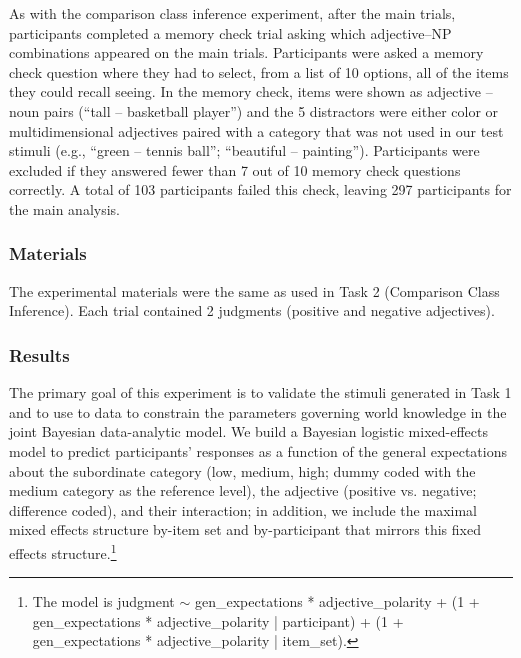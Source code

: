 \documentclass[doc]{apa6}
\begin{document}
As with the comparison class inference experiment, after the main trials, participants completed a memory check trial asking which adjective--NP combinations appeared on the main trials. 
Participants were asked a memory check question where they had to select, from a list of 10 options, all of the items they could recall seeing. In the memory check, items were shown as adjective -- noun pairs (``tall -- basketball player'') and the 5 distractors were either color or multidimensional adjectives paired with a category that was not used in our test stimuli (e.g., ``green -- tennis ball''; ``beautiful -- painting'').
Participants were excluded if they answered fewer than 7 out of 10 memory check questions correctly.
A total of 103 participants failed this check, leaving 297 participants for the main analysis. 

\subsubsection{Materials}

The experimental materials were the same as used in Task 2 (Comparison Class Inference).
Each trial contained 2 judgments (positive and negative adjectives).

\subsubsection{Results}

The primary goal of this experiment is to validate the stimuli generated in Task 1 and to use to data to constrain the parameters governing world knowledge in the joint Bayesian data-analytic model. We build a Bayesian logistic mixed-effects model to predict participants' responses as a function of the general expectations about the subordinate category (low, medium, high; dummy coded with the medium category as the reference level), the adjective (positive vs. negative; difference coded), and their interaction; in addition, we include the maximal mixed effects structure by-item set and by-participant that mirrors this fixed effects structure.\footnote{
The model is judgment $\sim$ gen\_expectations * adjective\_polarity + (1 + gen\_expectations * adjective\_polarity | participant) + (1 + gen\_expectations * adjective\_polarity | item\_set).
}
\end{document}
